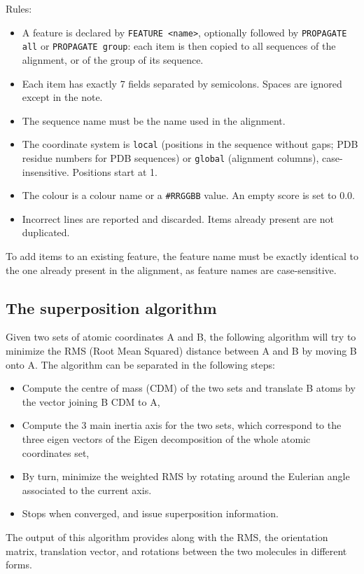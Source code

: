 \documentclass[a4paper]{article}
\begin{document}
Rules:
\begin{itemize}
  \item A feature is declared by \texttt{FEATURE <name>}, optionally followed by \texttt{PROPAGATE all} or \texttt{PROPAGATE group}: each item is then copied to all sequences of the alignment, or of the group of its sequence.
  \item Each item has exactly 7 fields separated by semicolons. Spaces are ignored except in the note.
  \item The sequence name must be the name used in the alignment.
  \item The coordinate system is \texttt{local} (positions in the sequence without gaps; PDB residue numbers for PDB sequences) or \texttt{global} (alignment columns), case-insensitive. Positions start at 1.
  \item The colour is a colour name or a \texttt{\#RRGGBB} value. An empty score is set to 0.0.
  \item Incorrect lines are reported and discarded. Items already present are not duplicated.
\end{itemize}
To add items to an existing feature, the feature name must be exactly identical to the one already present in the alignment, as feature names are case-sensitive.

\subsection{The superposition algorithm}
\label{app-superposition}
Given two sets of atomic coordinates A and B, the following algorithm will try to minimize the RMS (Root Mean Squared) distance between A and B by moving B onto A. The algorithm can be separated in the following steps:
\begin{itemize}
\item Compute the centre of mass (CDM) of the two sets and translate B atoms by the vector joining B CDM to A,
\item Compute the 3 main inertia axis for the two sets, which correspond to the three eigen vectors of the Eigen decomposition of the whole atomic coordinates set,
\item By turn, minimize the weighted RMS by rotating around the Eulerian angle associated to the current axis.
\item Stops when converged, and issue superposition information.
\end{itemize}

The output of this algorithm provides along with the RMS, the orientation matrix, translation vector, and rotations between the two molecules in different forms.
\end{document}
